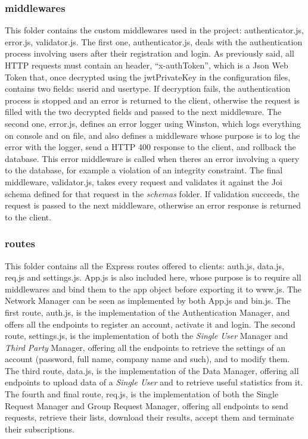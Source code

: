 \documentclass[titlepage]{article}
\begin{document}
	\subsubsection{middlewares}
	This folder contains the custom middlewares used in the project: authenticator.js, error.js, validator.js.
	The first one, authenticator.js, deals with the authentication process involving users after their registration and login. As previously said, all HTTP requests must contain an header, “x-authToken”, which is a Json Web Token that, once decrypted using the jwtPrivateKey in the configuration files, contains two fields: userid and usertype. If decryption fails, the authentication process is stopped and an error is returned to the client, otherwise the request is filled with the two decrypted fields and passed to the next middleware.
	The second one, error.js, defines an error logger using Winston, which logs everything on console and on file, and also defines a middleware whose purpose is to log the error with the logger, send a HTTP 400 response to the client, and rollback the database. This error middleware is called when there\textsc{}s an error involving a query to the database, for example a violation of an integrity constraint.
	The final middleware, validator.js, takes every request and validates it against the Joi schema defined for that request in the {\it schemas} folder. If validation succeeds, the request is passed to the next middleware, otherwise an error response is returned to the client.
	\subsubsection{routes}
	This folder contains all the Express routes offered to clients: auth.js, data.js, req.js and settings.js. App.js is also included here, whose purpose is to require all middlewares and bind them to the app object before exporting it to www.js. The Network Manager can be seen as implemented by both App.js and bin.js.
	The first route, auth.js, is the implementation of the Authentication Manager, and offers all the endpoints to register an account, activate it and login.
	The second route, settings.js, is the implementation of both the {\it Single User} Manager and {\it Third Party} Manager, offering all the endpoints to retrieve the settings of an account (password, full name, company name and such), and to modify them.
	The third route, data.js, is the implementation of the Data Manager, offering all endpoints to upload data of a {\it Single User} and to retrieve useful statistics from it.
	The fourth and final route, req.js, is the implementation of both the Single Request Manager and Group Request Manager, offering all endpoints to send requests, retrieve their lists, download their results, accept them and terminate their subscriptions.
	
\end{document}
